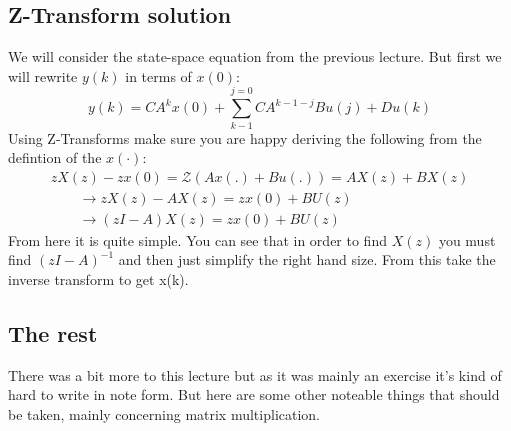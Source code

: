 \documentclass[a4paper,11pt]{article}
\begin{document}
\subsection{Z-Transform solution}
We will consider the state-space equation from the previous lecture. But first we will rewrite $y(k)$ in terms of $x(0)$:
\begin{equation}
    y(k) = CA^kx(0)+\sum\limits_{k-1}^{j=0}CA^{k-1-j}Bu(j) + Du(k)  
\end{equation}
Using Z-Transforms make sure you are happy deriving the following from the defintion of the $x(\cdot)$:
\begin{gather}
	zX(z) - zx(0) = \mathcal{Z}(Ax(.)+Bu(.))= AX(z)+BX(z)\\
	\qquad \rightarrow zX(z)-AX(z)=zx(0)+BU(z)\\
	\qquad \rightarrow (zI - A)X(z)= zx(0)+BU(z)
\end{gather}
From here it is quite simple. You can see that in order to find $X(z)$ you must find $(zI-A)^{-1}$ and then just simplify the right hand size. From this take the inverse transform to get x(k).
\subsection{The rest}
	There was a bit more to this lecture but as it was mainly an exercise it's kind of hard to write in note form. But here are some other noteable things that should be taken, mainly concerning matrix multiplication.\\\\
\end{document}
